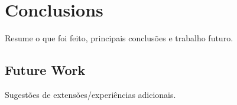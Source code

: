 \section{Conclusions}
\label{sec:conclusion}

Resume o que foi feito, principais conclusões e trabalho futuro.

\subsection{Future Work}

Sugestões de extensões/experiências adicionais.
